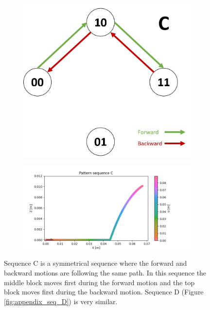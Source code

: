         
        \begin{figure}[h]
            \centering
            \begin{subfigure}{.2\textwidth}
            \includegraphics[width=\textwidth]{images/S_C.png}
            \end{subfigure}%
            \begin{subfigure}{.6\textwidth}
            \includegraphics[width=\textwidth]{images/C.png}
            \end{subfigure}
            \caption{Sequence C is a symmetrical sequence where the forward and backward motions are following the same path. In this sequence the middle block moves first during the forward motion and the top block moves first during the backward motion. Sequence D (Figure \ref{fig:appendix_seq_D}) is very similar.}
        \end{figure}
        
